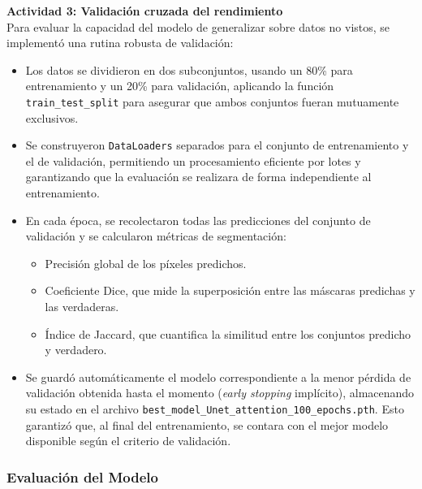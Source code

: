 \textbf{Actividad 3: Validación cruzada del rendimiento} \\
Para evaluar la capacidad del modelo de generalizar sobre datos no vistos, se implementó una rutina robusta de validación:
\begin{itemize}
\item Los datos se dividieron en dos subconjuntos, usando un 80\% para entrenamiento y un 20\% para validación, aplicando la función \texttt{train\_test\_split} para asegurar que ambos conjuntos fueran mutuamente exclusivos.
\item Se construyeron \texttt{DataLoaders} separados para el conjunto de entrenamiento y el de validación, permitiendo un procesamiento eficiente por lotes y garantizando que la evaluación se realizara de forma independiente al entrenamiento.
\item En cada época, se recolectaron todas las predicciones del conjunto de validación y se calcularon métricas de segmentación:
  \begin{itemize}
  \item Precisión global de los píxeles predichos.
  \item Coeficiente Dice, que mide la superposición entre las máscaras predichas y las verdaderas.
  \item Índice de Jaccard, que cuantifica la similitud entre los conjuntos predicho y verdadero.
  \end{itemize}
\item Se guardó automáticamente el modelo correspondiente a la menor pérdida de validación obtenida hasta el momento (\emph{early stopping} implícito), almacenando su estado en el archivo \texttt{best\_model\_Unet\_attention\_100\_epochs.pth}. Esto garantizó que, al final del entrenamiento, se contara con el mejor modelo disponible según el criterio de validación.
\end{itemize}

\subsubsection{Evaluación del Modelo}

